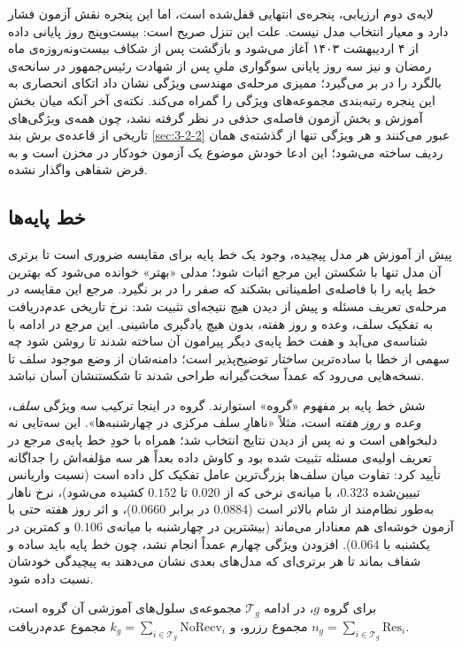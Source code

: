 لایه‌ی دوم ارزیابی، پنجره‌ی انتهایی قفل‌شده است، اما این پنجره نقش آزمون فشار دارد و
معیار انتخاب مدل نیست. علت این تنزل صریح است: بیست‌وپنج روز پایانی داده از ۴ اردیبهشت
۱۴۰۳ آغاز می‌شود و بازگشت پس از شکاف بیست‌ونه‌روزه‌ی ماه رمضان و نیز سه روز پایانی
سوگواری ملیِ پس از شهادت رئیس‌جمهور در سانحه‌ی بالگرد را در بر می‌گیرد؛ ممیزی مرحله‌ی مهندسی ویژگی نشان داد اتکای انحصاری به این پنجره
رتبه‌بندی مجموعه‌های ویژگی را گمراه می‌کند. نکته‌ی آخر آنکه میان بخش آموزش و بخش آزمون
فاصله‌ی حذفی در نظر گرفته نشد، چون همه‌ی ویژگی‌های تاریخی از قاعده‌ی برش بند \ref{sec:3-2-2} عبور
می‌کنند و هر ویژگی تنها از گذشته‌ی همان ردیف ساخته می‌شود؛ این ادعا خودش موضوع یک آزمون
خودکار در مخزن است و به فرض شفاهی واگذار نشده.

\subsection{خط پایه‌ها}
\label{sec:4-3-3}

پیش از آموزش هر مدل پیچیده، وجود یک خط پایه برای مقایسه ضروری
است تا برتری آن مدل تنها با شکستن این مرجع اثبات شود؛
مدلی «بهتر» خوانده می‌شود که بهترین خط پایه را با فاصله‌ی اطمینانی بشکند که صفر را در بر
نگیرد. مرجع این مقایسه در مرحله‌ی تعریف مسئله و پیش از دیدن هیچ نتیجه‌ای تثبیت شد: نرخ
تاریخی عدم‌دریافت به تفکیک سلف، وعده و روز هفته، بدون هیچ یادگیری ماشینی. این مرجع در
ادامه با شناسه‌ی  می‌آید و هفت خط پایه‌ی دیگر پیرامون آن ساخته شدند تا روشن شود
چه سهمی از خطا با ساده‌ترین ساختار توضیح‌پذیر است؛ دامنه‌شان از وضع موجود سلف تا
نسخه‌هایی می‌رود که عمداً سخت‌گیرانه طراحی شدند تا شکستنشان آسان نباشد.

شش خط پایه بر مفهوم «گروه» استوارند. گروه در اینجا ترکیب سه ویژگی \emph{سلف}،
\emph{وعده} و \emph{روز هفته} است، مثلاً «ناهارِ سلف مرکزی در چهارشنبه‌ها». این سه‌تایی
نه دلبخواهی است و نه پس از دیدن نتایج انتخاب شد؛ همراه با خودِ خط پایه‌ی مرجع در تعریف
اولیه‌ی مسئله تثبیت شده بود و کاوش داده بعداً هر سه مؤلفه‌اش را جداگانه تأیید کرد: تفاوت
میان سلف‌ها بزرگ‌ترین عامل تفکیک کل داده است (نسبت واریانس تبیین‌شده $0.323$، با میانه‌ی
نرخی که از $0.020$ تا $0.152$ کشیده می‌شود)، نرخ ناهار به‌طور نظام‌مند از شام بالاتر است
($0.0884$ در برابر $0.0660$)، و اثر روز هفته حتی با آزمون خوشه‌ای هم معنادار می‌ماند
(بیشترین در چهارشنبه با میانه‌ی $0.106$ و کمترین در یکشنبه با $0.064$). افزودن ویژگی
چهارم عمداً انجام نشد، چون خط پایه باید ساده و شفاف بماند تا هر برتری‌ای که مدل‌های بعدی
نشان می‌دهند به پیچیدگی خودشان نسبت داده شود.

برای گروه $g$، در ادامه $\mathcal{T}_g$ مجموعه‌ی سلول‌های آموزشی آن گروه است،
$n_g = \sum_{i \in \mathcal{T}_g} \mathrm{Res}_i$ مجموع رزرو، و
$k_g = \sum_{i \in \mathcal{T}_g} \mathrm{NoRecv}_i$ مجموع عدم‌دریافت.

